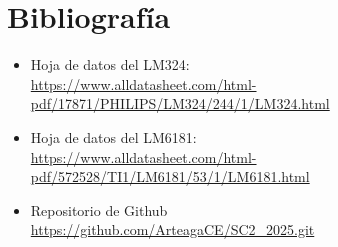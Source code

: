 \newpage
\section{Bibliografía}
\begin{itemize}
    \item Hoja de datos del LM324:\\
    \url{https://www.alldatasheet.com/html-pdf/17871/PHILIPS/LM324/244/1/LM324.html}
    \item Hoja de datos del LM6181:\\
    \url{https://www.alldatasheet.com/html-pdf/572528/TI1/LM6181/53/1/LM6181.html}
    \item Repositorio de Github\\
    \url{https://github.com/ArteagaCE/SC2_2025.git}
\end{itemize}
